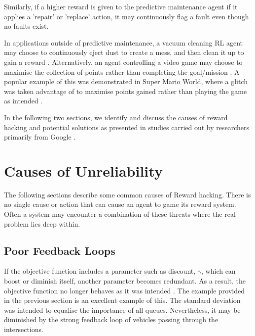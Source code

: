 Similarly, if a higher reward is given to the predictive maintenance agent if it applies a 'repair' or 'replace' action, it may continuously flag a fault even though no faults exist. 

In applications outside of predictive maintenance, a vacuum cleaning RL agent may choose to continuously eject dust to create a mess, and then clean it up to gain a reward \cite{inverse-reward}.
Alternatively, an agent controlling a video game may choose to maximise the collection of points rather than completing the goal/mission \cite{inverse-reward}. 
A popular example of this was demonstrated in Super Mario World, where a glitch was taken advantage of to maximise points gained rather than playing the game as intended \cite{mario}.

In the following two sections, we identify and discuss the causes of reward hacking and potential solutions as presented in studies carried out by researchers primarily from Google \cite{Amodei} \cite{DBLP:journals/corr/abs-1908-04734}.

\section{Causes of Unreliability}
\label{sec:causes}
The following sections describe some common causes of Reward hacking.
There is no single cause or action that can cause an agent to game its reward system. 
Often a system may encounter a combination of these threats where the real problem lies deep within.

\subsection{Poor Feedback Loops}
If the objective function includes a parameter such as discount, $\gamma$, which can boost or diminish itself, another parameter becomes redundant.
As a result, the objective function no longer behaves as it was intended \cite{Amodei}.
The example provided in the previous section is an excellent example of this. The standard deviation was intended to equalise the importance of all queues.
Nevertheless, it may be diminished by the strong feedback loop of vehicles passing through the intersections.

